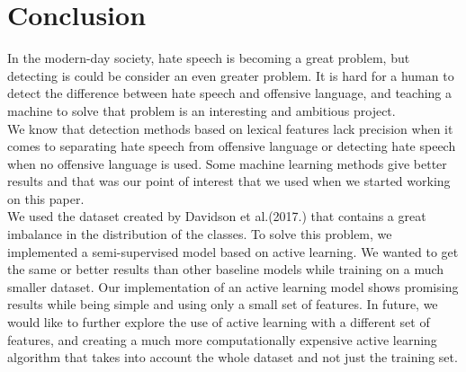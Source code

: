 \documentclass[10pt, a4paper]{article}
\begin{document}
\section{Conclusion}
In the modern-day society, hate speech is becoming a great problem, but detecting is could be consider an even greater problem. It is hard for a human to detect the difference between hate speech and offensive language, and teaching a machine to solve that problem is an interesting and ambitious project.
\\We know that detection methods based on lexical features lack precision when it comes to separating hate speech from offensive language or detecting hate speech when no offensive language is used. Some machine learning methods give better results and that was our point of interest that we used when we started working on this paper.
\\We used the dataset created by Davidson et al.(2017.) that contains a great imbalance in the distribution of the classes. To solve this problem, we implemented a semi-supervised model based on active learning. We wanted to get the same or better results than other baseline models while training on a much smaller dataset. Our implementation of an active learning model shows promising results while being simple and using only a small set of features. In future, we would like to further explore the use of active learning with a different set of features, and creating a much more computationally expensive active learning algorithm that takes into account the whole dataset and not just the training set.


 
\end{document}
